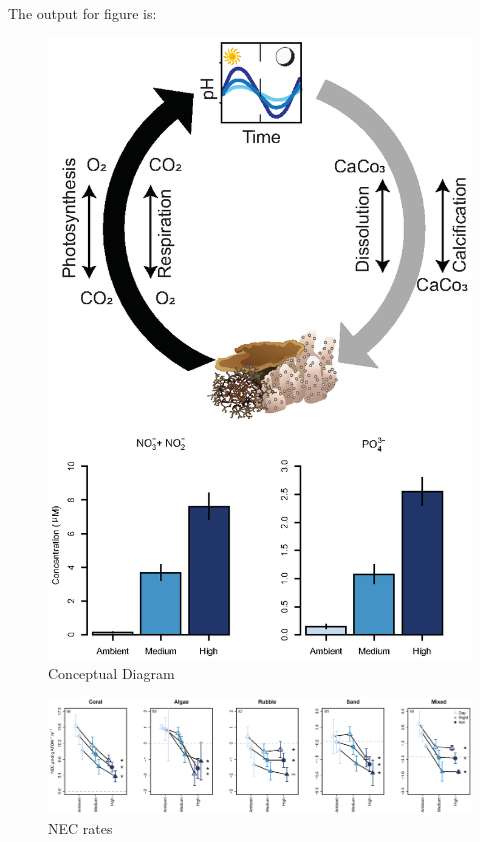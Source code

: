 \documentclass{article}%
\begin{document}
The output for figure is:
\begin{figure}[!h]
\centering\includegraphics[width=6.5in]{ConceptualDiagram.eps}
\caption{Conceptual Diagram}
\label{ConcDiag}
\end{figure}

\begin{figure}[!h]
\centering\includegraphics[width=6.5in]{MeanRates_NEC.eps}
\caption{NEC rates}
\label{NEC}
\end{figure}
\end{document}
